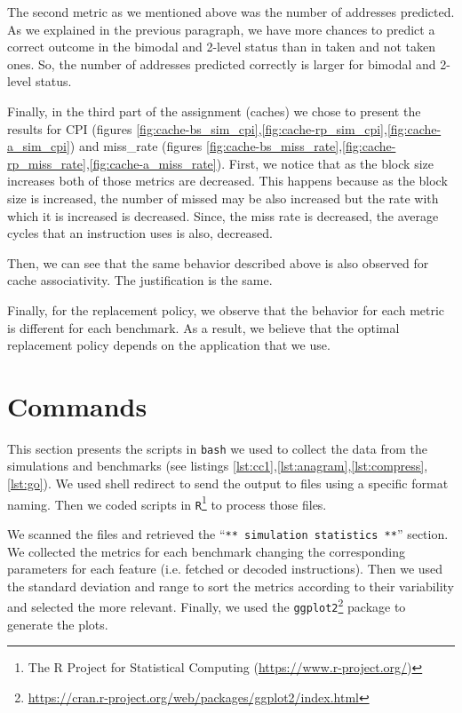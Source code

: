 \documentclass[10pt]{scrartcl}
\begin{document}
\par The second metric as we mentioned above was the number of addresses predicted. As we explained in the previous paragraph, we have more chances to predict a correct outcome in the bimodal and 2-level status than in taken and not taken ones. So, the number of addresses predicted correctly is larger for bimodal and 2-level status. 
\par Finally, in the third part of the assignment (caches) we chose to present the results for CPI (figures \ref{fig:cache-bs_sim_cpi},\ref{fig:cache-rp_sim_cpi},\ref{fig:cache-a_sim_cpi}) and miss\_rate (figures \ref{fig:cache-bs_miss_rate},\ref{fig:cache-rp_miss_rate},\ref{fig:cache-a_miss_rate}). First, we notice that as the block size increases both of those metrics are decreased. This happens because as the block size is increased, the number of missed may be also increased but the rate with which it is increased is decreased. Since, the miss rate is decreased, the average cycles that an instruction uses is also, decreased. 
\par Then, we can see that the same behavior described above is also observed for cache associativity. The justification is the same. 
\par Finally, for the replacement policy, we observe that the behavior for each metric is different for each benchmark. As a result, we believe that the optimal replacement policy depends on the application that we use.  

\section{Commands}\label{sec:commands}
This section presents the scripts in \texttt{bash} we used to collect the data from the simulations and benchmarks (see listings \ref{lst:cc1},\ref{lst:anagram},\ref{lst:compress},\ref{lst:go}). We used shell redirect to send the output to files using a specific format naming.  Then we coded scripts in \texttt{R}\footnote{The R Project for Statistical Computing (\url{https://www.r-project.org/})} to process those files.  

We scanned the files and retrieved the ``\texttt{** simulation statistics **}'' section. We collected the metrics for each benchmark changing the corresponding parameters for each feature (i.e. fetched or decoded instructions).  Then we used the standard deviation and range to sort the metrics according to their variability and selected the more relevant.  Finally, we used the \texttt{ggplot2}\footnote{\url{https://cran.r-project.org/web/packages/ggplot2/index.html}} package to generate the plots.
\end{document}
